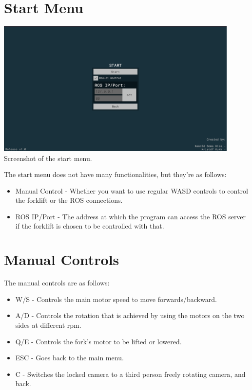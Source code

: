 \documentclass{article}
\begin{document}
\pagebreak

\section{Start Menu}
\begin{center}
    \includegraphics[width=12.1cm]{start_menu}\linebreak
    \small Screenshot of the start menu.
\end{center}

\normalsize
The start menu does not have many functionalities, but they're as follows:
\begin{itemize}
    \item Manual Control - Whether you want to use regular WASD controls to control the
    forklift or the ROS connections.
    \item ROS IP/Port - The address at which the program can access the ROS server if
    the forklift is chosen to be controlled with that.
\end{itemize}

\section{Manual Controls}
The manual controls are as follows:
\begin{itemize}
    \item W/S - Controls the main motor speed to move forwards/backward.
    \item A/D - Controls the rotation that is achieved by using the motors on the two
    sides at different rpm.
    \item Q/E - Controls the fork's motor to be lifted or lowered.
    \item ESC - Goes back to the main menu.
    \item C - Switches the locked camera to a third person freely rotating camera, and back.
\end{itemize}
\end{document}
